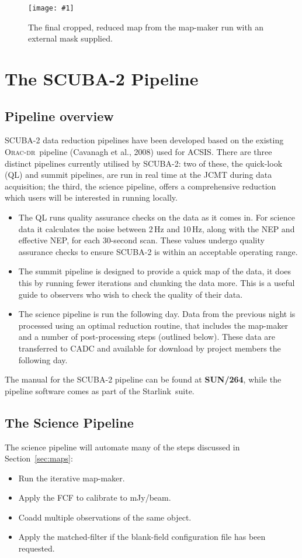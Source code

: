 \documentclass[twoside,11pt]{article}
\newcommand{\htmladdnormallink}[2]{#1}
\newcommand{\htmladdimg}[1]{}
\newcommand{\htmlref}[2]{#1}
\newcommand{\latexhtml}[2]{#1}
\newcommand{\xref}[3]{#1}
\newcommand{\xlabel}[1]{}
\renewcommand{\_}{\texttt{\symbol{95}}}
\newcommand{\starlink}{\htmladdnormallink{Starlink}{http://starlink.jach.hawaii.edu}}
\newcommand{\oracdr}{\htmladdnormallink{\textsc{Orac-dr}}{http://www.oracdr.org/oracdr}}
\newcommand{\pipelinesun}{\xref{\textbf{SUN/264}}{sun264}{}}
\newcommand{\myfig}[5]{
  \begin{figure}#2
    \centering\texttt{[image: \#1]}
    \typeout{#1.eps inserted on page \arabic{page}}
    \caption{\label{#4}\small #5}
  \end{figure}
}
\newcommand{\myfig}[5]{
    \label{#4} \htmladdimg{#1.png}\\
    \\
    Figure: #5\\
  }
\newcommand{\cref}[3]{\latexhtml{#1~\ref{#2}}{\htmlref{#3}{#2}}}
\begin{document}
\myfig{sc21_gal12_crop}{[t!]}{width=0.8\hsize}{fig:crop_map}{
The final cropped, reduced map from the map-maker run with
an external mask supplied.}


\clearpage
\section{\xlabel{pipeline}The SCUBA-2 Pipeline}
\label{sec:pipe}
\subsection{\xlabel{pl_overview}Pipeline overview}

SCUBA-2 data reduction pipelines have been developed based on the
existing \oracdr\ pipeline (Cavanagh et al., 2008\cite{oracdr}) used
for ACSIS. There are three distinct pipelines currently utilised by
SCUBA-2: two of these, the quick-look (QL) and summit pipelines, are
run in real time at the JCMT during data acquisition; the third, the science
pipeline, offers a comprehensive reduction which users will be
interested in running locally.

\begin{itemize}
\item The QL runs quality assurance checks on the data as it comes in.
For science data it calculates the noise between 2\,Hz and 10\,Hz,
along with the NEP and effective NEP, for each 30-second scan. These
values undergo quality assurance checks to ensure SCUBA-2 is within
an acceptable operating range.
\item The summit pipeline is designed to provide a quick map of the
data, it does this by running fewer iterations and chunking the data
more. This is a useful guide to observers who wish to check the
quality of their data.
\item The science pipeline is run the following day. Data from the
previous night is processed using an optimal reduction routine, that
includes the map-maker and a number of post-processing steps (outlined
below). These data are transferred to CADC and available for download
by project members the following day.
\end{itemize}

The manual for the SCUBA-2 pipeline can be found at \pipelinesun,
while the pipeline software comes as part of the \starlink\ suite.


\subsection{\xlabel{science_pl}The Science Pipeline}
The science pipeline will automate many of the steps discussed in
\cref{Section}{sec:maps}{Reducing your data}:
\vspace{-0.3cm}
\begin{itemize}\itemsep-0.3em
\item Run the iterative map-maker.
\item Apply the FCF to calibrate to mJy/beam.
\item Coadd multiple observations of the same object.
\item Apply the matched-filter if the blank-field configuration file
has been requested.
\end{itemize}
\end{document}
